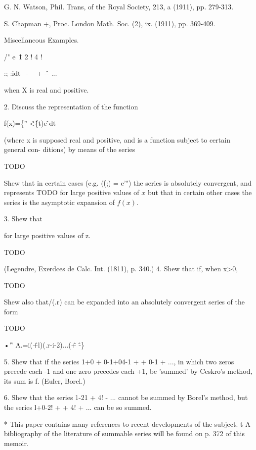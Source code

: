 G. N. Watson, Phil. Trans, of the Royal Society, 213, a (1911), pp.
279-313.

S. Chapman +, Proc. London Math. Soc. (2), ix. (1911), pp. 369-409.

Miscellaneous Examples.

/" e~\^ 1 2 ! 4 !

:; :idt~ - ~ + -\^ - ...

when X is real and positive.

2. Discuss the representation of the function

f(x)=\{'' \^<\^\{t)e\^-dt

(where x is supposed real and positive, and is a function subject to
certain general con- ditions) by means of the series

TODO

Shew that in certain cases (e.g. (\^(;) = e'") the series is
absolutely convergent, and represents TODO for large positive values
of $x$ but that in certain other cases the series is the asymptotic
expansion of $f(x)$.

3. Shew that

for large positive values of z.

TODO

(Legendre, Exerdces de Calc. Int. (1811), p. 340.) 4. Shew that if,
when x>0,

TODO

Shew also that/(.r) can be expanded into an absolutely convergent
series of the form

TODO 

•'\^ ' A.=i(\^+l)(.r-i-2)...(\^ + \^-\}

5. Shew that if the series 1+0 + 0-1+04-1 + + 0-1 + ..., in which two
zeros precede each -1 and one zero precedes each +1, be 'summed' by
Ceskro's method, its sum is f. (Euler, Borel.)

6. Shew that the series 1-21 + 4! - ... cannot be summed by Borel's
method, but the series l+0-2! + + 4! + ... can be so summed.

* This paper contains many references to recent developments of the
subject. t A bibliography of the literature of summable series will be
found on p. 372 of this memoir.